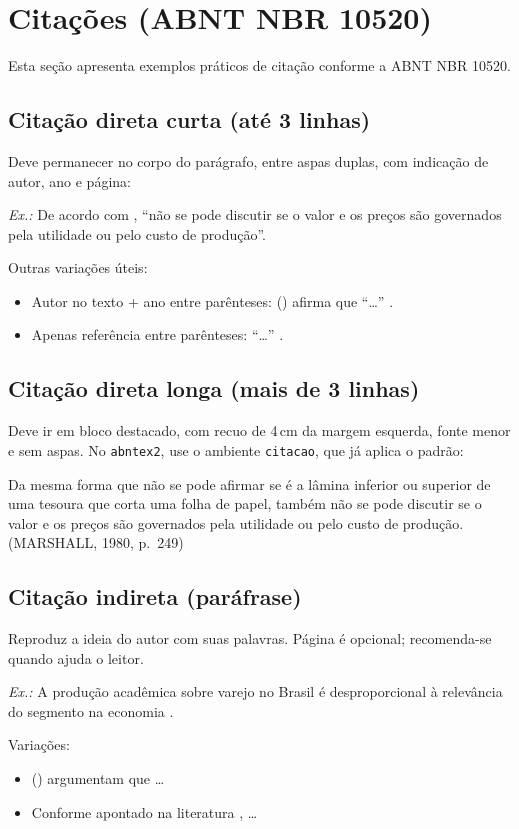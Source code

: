%
%

\section{Citações (ABNT NBR 10520)}

Esta seção apresenta exemplos práticos de citação conforme a ABNT NBR 10520.

\subsection{Citação direta curta (até 3 linhas)}
Deve permanecer no corpo do parágrafo, entre aspas duplas, com indicação de autor, ano e página:
\begin{flushleft}
\textit{Ex.:} De acordo com , ``não se pode discutir se o valor e os preços são governados pela utilidade ou pelo custo de produção''.
\end{flushleft}

Outras variações úteis:
\begin{itemize}
  \item Autor no texto + ano entre parênteses: \citeauthor{marshall1980} (\citeyear{marshall1980}) afirma que ``\ldots'' \cite[p.~249]{marshall1980}.
  \item Apenas referência entre parênteses: ``\ldots'' \cite[p.~249]{marshall1980}.
\end{itemize}

\subsection{Citação direta longa (mais de 3 linhas)}
Deve ir em bloco destacado, com recuo de 4\,cm da margem esquerda, fonte menor e sem aspas. 
No \texttt{abntex2}, use o ambiente \texttt{citacao}, que já aplica o padrão:
\begin{citacao}
Da mesma forma que não se pode afirmar se é a lâmina inferior ou superior de uma tesoura que corta uma folha de papel, também não se pode discutir se o valor e os preços são governados pela utilidade ou pelo custo de produção. (MARSHALL, 1980, p.~249)
\end{citacao}

\subsection{Citação indireta (paráfrase)}
Reproduz a ideia do autor com suas palavras. Página é opcional; recomenda-se quando ajuda o leitor.
\begin{flushleft}
\textit{Ex.:} A produção acadêmica sobre varejo no Brasil é desproporcional à relevância do segmento na economia \cite{angelo1993}.
\end{flushleft}
Variações:
\begin{itemize}
  \item \citeauthor{angelo1993} (\citeyear{angelo1993}) argumentam que \ldots
  \item Conforme apontado na literatura \cite{tanenbaum1995sistemas,de2017sistema}, \ldots
\end{itemize}

